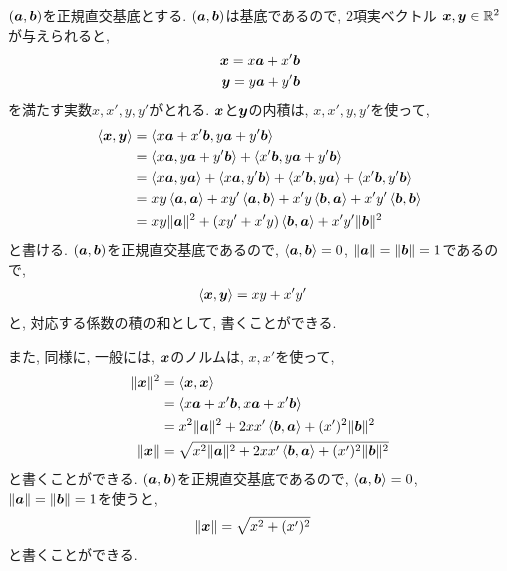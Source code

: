 \begin{remark}
  $(\aaa,\bbb)$を正規直交基底とする.
  $(\aaa,\bbb)$は基底であるので,
  $2$項実ベクトル
  $\xx,\yy\in\RR^2$が与えられると,
  \begin{align*}
    \xx=x\aaa+x'\bbb\\
    \yy=y\aaa+y'\bbb
  \end{align*}
  を満たす実数$x,x',y,y'$がとれる.
  $\xx$と$\yy$の内積は, 
  $x,x',y,y'$を使って,
  \begin{align*}
    \Braket{\xx,\yy}
    &=\Braket{x\aaa+x'\bbb,y\aaa+y'\bbb}\\
    &=\Braket{x\aaa,y\aaa+y'\bbb}+\Braket{x'\bbb,y\aaa+y'\bbb}\\
    &=\Braket{x\aaa,y\aaa}+\Braket{x\aaa,y'\bbb}+\Braket{x'\bbb,y\aaa}+\Braket{x'\bbb,y'\bbb}\\
    &=xy\Braket{\aaa,\aaa}+xy'\Braket{\aaa,\bbb}+x'y\Braket{\bbb,\aaa}+x'y'\Braket{\bbb,\bbb}\\
    &=xy\|\aaa\|^2+(xy'+x'y)\Braket{\bbb,\aaa}+x'y'\|\bbb\|^2
  \end{align*}
  と書ける.
  $(\aaa,\bbb)$を正規直交基底であるので,
  $\Braket{\aaa,\bbb}=0$, $\|\aaa\|=\|\bbb\|=1$であるので,
  \begin{align*}
    \Braket{\xx,\yy}
    &=xy+x'y'
  \end{align*}
  と, 対応する係数の積の和として, 書くことができる.

  また, 同様に, 一般には,  $\xx$のノルムは, $x,x'$を使って,
  \begin{align*}
    \|\xx\|^2
    &=\Braket{\xx,\xx}\\
    &=\Braket{x\aaa+x'\bbb,x\aaa+x'\bbb}\\
    &=x^2\|\aaa\|^2+2xx'\Braket{\bbb,\aaa}+(x')^2\|\bbb\|^2\\
    \|\xx\|
    &=\sqrt{x^2\|\aaa\|^2+2xx'\Braket{\bbb,\aaa}+(x')^2\|\bbb\|^2}
  \end{align*}
  と書くことができる.
  $(\aaa,\bbb)$を正規直交基底であるので,
  $\Braket{\aaa,\bbb}=0$, $\|\aaa\|=\|\bbb\|=1$を使うと,
  \begin{align*}
    \|\xx\|
    &=\sqrt{x^2+(x')^2}
  \end{align*}
  と書くことができる.  
\end{remark}


